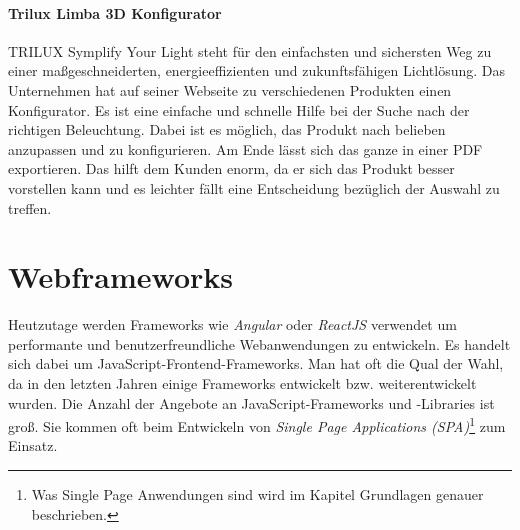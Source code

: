 \paragraph{Trilux Limba 3D Konfigurator} TRILUX Symplify Your Light steht für den einfachsten und sichersten Weg zu einer maßgeschneiderten, energieeffizienten und zukunftsfähigen Lichtlösung. Das Unternehmen hat auf seiner Webseite zu verschiedenen Produkten einen Konfigurator. Es ist eine einfache und schnelle Hilfe bei der Suche nach der richtigen Beleuchtung. Dabei ist es möglich, das Produkt nach belieben anzupassen und zu konfigurieren. Am Ende lässt sich das ganze in einer PDF exportieren. Das hilft dem Kunden enorm, da er sich das Produkt besser vorstellen kann und es leichter fällt eine Entscheidung bezüglich der Auswahl zu treffen.\\
%
\section{Webframeworks}
\label{sec:webframeworks}
%
Heutzutage werden Frameworks wie \textit{Angular} oder \textit{ReactJS} verwendet um performante und benutzerfreundliche Webanwendungen zu entwickeln. Es handelt sich dabei um JavaScript-Frontend-Frameworks. Man hat oft die Qual der Wahl, da in den letzten Jahren einige Frameworks entwickelt bzw. weiterentwickelt wurden. Die Anzahl der Angebote an JavaScript-Frameworks und -Libraries ist groß. Sie kommen oft beim Entwickeln von \textit{Single Page Applications (SPA)}\footnote{Was Single Page Anwendungen sind wird im Kapitel Grundlagen genauer beschrieben.}  zum Einsatz.
%

